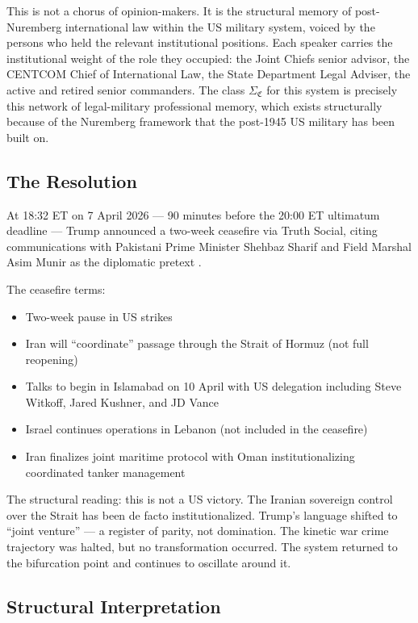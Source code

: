 \documentclass[12pt,a4paper]{article}
\newcommand{\SigmaCF}{\Sigma_{\mathfrak{C}}}  %
\begin{document}
This is not a chorus of opinion-makers. It is the structural memory of post-Nuremberg international law within the US military system, voiced by the persons who held the relevant institutional positions. Each speaker carries the institutional weight of the role they occupied: the Joint Chiefs senior advisor, the CENTCOM Chief of International Law, the State Department Legal Adviser, the active and retired senior commanders. The class $\SigmaCF$ for this system is precisely this network of legal-military professional memory, which exists structurally because of the Nuremberg framework that the post-1945 US military has been built on.

\subsection{The Resolution}

At 18:32 ET on 7 April 2026 --- 90 minutes before the 20:00 ET ultimatum deadline --- Trump announced a two-week ceasefire via Truth Social, citing communications with Pakistani Prime Minister Shehbaz Sharif and Field Marshal Asim Munir as the diplomatic pretext \cite{aljazeera_ceasefire}.

The ceasefire terms:
\begin{itemize}[leftmargin=2em]
    \item Two-week pause in US strikes
    \item Iran will ``coordinate'' passage through the Strait of Hormuz (not full reopening)
    \item Talks to begin in Islamabad on 10 April with US delegation including Steve Witkoff, Jared Kushner, and JD Vance
    \item Israel continues operations in Lebanon (not included in the ceasefire)
    \item Iran finalizes joint maritime protocol with Oman institutionalizing coordinated tanker management
\end{itemize}

The structural reading: this is not a US victory. The Iranian sovereign control over the Strait has been de facto institutionalized. Trump's language shifted to ``joint venture'' --- a register of parity, not domination. The kinetic war crime trajectory was halted, but no transformation occurred. The system returned to the bifurcation point and continues to oscillate around it.

\subsection{Structural Interpretation}
\end{document}
